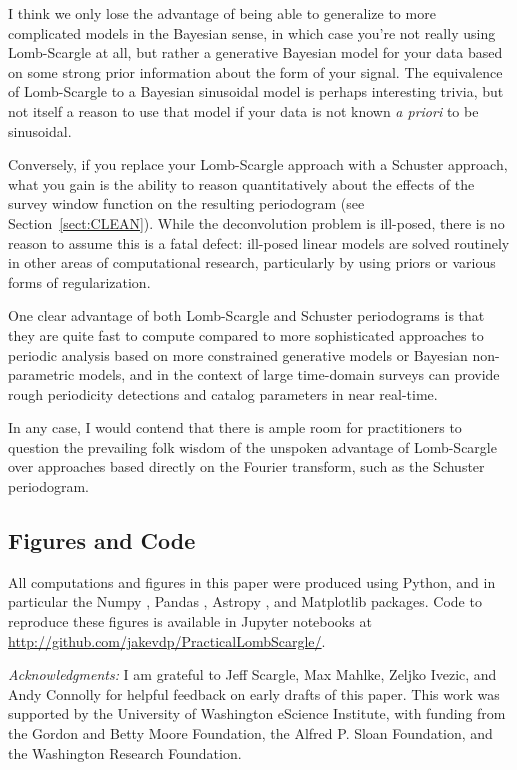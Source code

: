\documentclass[preprint]{aastex}
\newcommand{\Sect}[1]{Section~\ref{sect:#1}}
\newcommand{\sect}[1]{\Sect{#1}}
\begin{document}
I think we only lose the advantage of being able to generalize to more
complicated models in the Bayesian sense, in which case you're not really
using Lomb-Scargle at all, but rather a generative Bayesian model for your
data based on some strong prior information about the form of your signal.
The equivalence of Lomb-Scargle to a Bayesian sinusoidal model is perhaps
interesting trivia, but not itself a reason to use that model if your data
is not known {\it a priori} to be sinusoidal.

Conversely, if you replace your Lomb-Scargle approach with a Schuster approach,
what you gain is the ability to reason quantitatively about the effects of the
survey window function on the resulting periodogram (see \sect{CLEAN}).
While the deconvolution problem is ill-posed, there is no reason to assume
this is a fatal defect: ill-posed linear models are solved routinely in
other areas of computational research, particularly by using priors or
various forms of regularization.

One clear advantage of both Lomb-Scargle and Schuster periodograms is that
they are quite fast to compute compared to more sophisticated approaches to
periodic analysis based on more constrained generative models or Bayesian
non-parametric models, and in the context of large time-domain surveys can
provide rough periodicity detections and catalog parameters in near real-time.

In any case, I would contend that there is ample room for practitioners to
question the prevailing folk wisdom of the unspoken advantage of Lomb-Scargle
over approaches based directly on the Fourier transform, such as the Schuster
periodogram.


\subsection{Figures and Code}

All computations and figures in this paper were produced using Python,
and in particular the
Numpy \citep{numpy, numpybook},
Pandas \citep{pandas},
Astropy \citep{Astropy2013},
and Matplotlib \citep{matplotlib} packages.
Code to reproduce these figures is available in Jupyter notebooks at
\url{http://github.com/jakevdp/PracticalLombScargle/}.


{\it Acknowledgments:} I am grateful to Jeff Scargle, Max Mahlke,
Zeljko Ivezic, and Andy Connolly for helpful feedback on early drafts
of this paper.
This work was supported by the University of Washington eScience Institute,
with funding from the Gordon and Betty Moore Foundation, the Alfred P. Sloan
Foundation, and the Washington Research Foundation.




\end{document}
